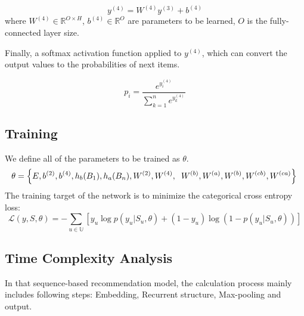 \documentclass[runningheads]{llncs}
\begin{document}
\begin{equation}
y^{(4)}=W^{(4)}y^{(3)}+b^{(4)}
\end{equation}
where $W^{(4)}\in \mathbb{R}^{O\times H}$, $b^{(4)}\in \mathbb{R}^{O}$ are parameters to be learned, $O$ is the fully-connected layer size.

Finally, a softmax activation function applied to $y^{(4)}$, which can convert the output values to the probabilities of next items. 

\begin{equation}
p_{i}= \frac{e^{y_{i}^{(4)}}}{\sum_{k=1}^{n}e^{y_{k}^{(4)}}}
\end{equation}

\subsection{Training}

We define all of the parameters to be trained as $\theta $.
\begin{equation}
\theta=  \left \{ E,b^{(2)},b^{(4)},h_{b}(B_{1}),h_{a}(B_{n}),W^{(2)}, W^{(4)},\right.\\
\left.W^{(b)},W^{(a)},W^{(b)},W^{(cb)},W^{(ca)} \right \} \\
\end{equation}
The training target of the network is to minimize the categorical cross entropy loss:
\begin{equation}
\mathcal{L}(y,S,\theta )=-\sum_{u\in \mathbb{U}}[y_{u}\log p(y_{u}|S_{u},\theta)+(1-y_{u})\log (1-p(y_{u}|S_{u},\theta ))]
\end{equation}
\subsection{Time Complexity Analysis}

In that sequence-based recommendation model, the calculation process mainly includes following steps: Embedding, Recurrent structure, Max-pooling and output.
\end{document}
